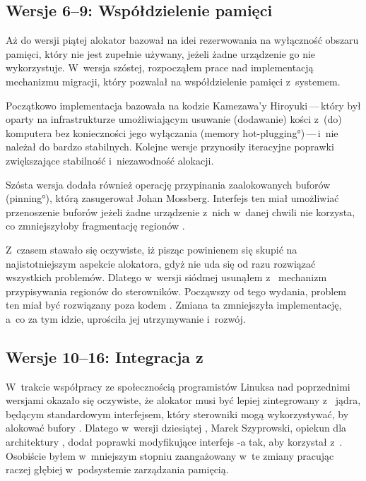 \subsection{Wersje 6--9: Współdzielenie pamięci}

Aż do wersji piątej alokator  bazował na idei rezerwowania na
wyłączność obszaru pamięci, który nie jest zupełnie używany, jeżeli
żadne urządzenie go nie wykorzystuje.  W~wersja szóstej, rozpocząłem
prace nad implementacją mechanizmu migracji, który pozwalał na
współdzielenie pamięci  z~systemem.

Początkowo implementacja bazowała na kodzie Kamezawa'y
Hiroyuki\,---\,który był oparty na infrastrukturze umożliwiającym
usuwanie (dodawanie) kości  z~(do) komputera bez konieczności
jego wyłączania (\ang{memory hot-plugging})\,---\,i~nie należał do
bardzo stabilnych.  Kolejne wersje  przynosiły iteracyjne
poprawki zwiększające stabilność i~niezawodność alokacji.

Szósta wersja dodała również operację przypinania zaalokowanych
buforów (\ang{pinning}), którą zasugerował Johan Mossberg.  Interfejs
ten miał umożliwiać przenoszenie buforów  jeżeli żadne
urządzenie z~nich w~danej chwili nie korzysta, co zmniejszyłoby
fragmentację regionów .

Z~czasem stawało się oczywiste, iż pisząc  powinienem się skupić na
najistotniejszym aspekcie alokatora, gdyż nie uda się od razu
rozwiązać wszystkich problemów.  Dlatego w~wersji siódmej usunąłem
z~ mechanizm przypisywania regionów  do sterowników.  Począwszy
od tego wydania, problem ten miał być rozwiązany poza kodem .
Zmiana ta zmniejszyła implementację, a~co za tym idzie, uprościła jej
utrzymywanie i~rozwój.

\subsection{Wersje 10--16: Integracja z~ }

W~trakcie współpracy ze społecznością programistów Linuksa nad
poprzednimi wersjami  okazało się oczywiste, że alokator musi
być lepiej zintegrowany z~  jądra, będącym
standardowym interfejsem, który sterowniki mogą wykorzystywać, by
alokować bufory .  Dlatego w~wersji dziesiątej ,
Marek Szyprowski, opiekun   dla architektury
, dodał poprawki modyfikujące interfejs  -a
tak, aby korzystał z~.  Osobiście byłem w~mniejszym stopniu
zaangażowany w~te zmiany pracując raczej głębiej w~podsystemie
zarządzania pamięcią.

